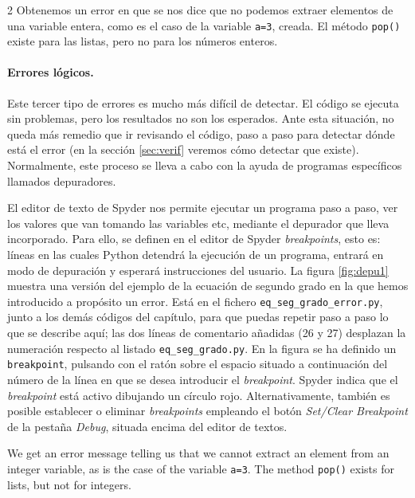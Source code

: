 \begin{paracol}{2}
Obtenemos un error en que se nos dice que no podemos extraer elementos de una variable entera, como es el caso de la variable \texttt{a=3}, creada. El método \texttt{pop()} existe para las listas, pero no para los números enteros.

\paragraph{Errores lógicos.} Este tercer tipo de errores es mucho más difícil de detectar. El código se ejecuta sin problemas, pero los resultados no son los esperados. Ante esta situación, no queda más remedio que ir revisando el código, paso a paso para detectar dónde está el error (en la sección \ref{sec:verif} veremos cómo detectar que existe). Normalmente, este proceso se lleva a cabo con la ayuda de programas específicos llamados depuradores.

El editor de texto de Spyder nos permite ejecutar un programa paso a paso, ver los valores que van tomando las variables etc, mediante el depurador que lleva incorporado. Para ello, se definen en el editor de Spyder \emph{breakpoints}, esto es: líneas en las cuales Python detendrá la ejecución de un programa, entrará en modo de depuración y esperará instrucciones del usuario. La figura \ref{fig:depu1} muestra una versión del ejemplo de la ecuación de segundo grado en la que hemos introducido a propósito un error. Está en el fichero \texttt{eq\_seg\_grado\_error.py}, junto a los demás códigos del capítulo, para que puedas repetir paso a paso lo que se describe aquí; las dos líneas de comentario añadidas (26 y 27) desplazan la numeración respecto al listado \texttt{eq\_seg\_grado.py}. En la figura se ha definido un \texttt{breakpoint}, pulsando con el ratón sobre el espacio situado a continuación del número de la línea en que se desea  introducir el \emph{breakpoint}.  Spyder indica que el \emph{breakpoint} está activo dibujando un círculo rojo. Alternativamente, también es posible establecer o eliminar \emph{breakpoints} empleando el botón \emph{Set/Clear Breakpoint} de la pestaña \emph{Debug}, situada encima del editor de textos.

\switchcolumn
We get an error message telling us that we cannot extract an element from an integer variable, as is the case of the variable \texttt{a=3}. The method \texttt{pop()} exists for lists, but not for integers.


\end{paracol}
